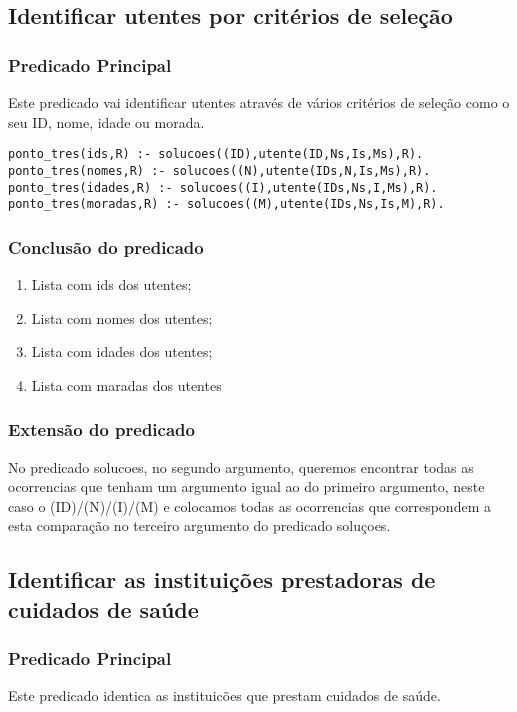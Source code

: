 \documentclass[a4paper]{report} %
\begin{document}
\subsection{Identificar utentes por critérios de seleção}

\subsubsection{Predicado Principal}
Este predicado vai identificar utentes através de vários critérios de seleção como o seu ID, nome, idade ou morada.

\begin{verbatim}
ponto_tres(ids,R) :- solucoes((ID),utente(ID,Ns,Is,Ms),R).
ponto_tres(nomes,R) :- solucoes((N),utente(IDs,N,Is,Ms),R).
ponto_tres(idades,R) :- solucoes((I),utente(IDs,Ns,I,Ms),R).
ponto_tres(moradas,R) :- solucoes((M),utente(IDs,Ns,Is,M),R).
\end{verbatim}

\subsubsection{Conclusão do predicado} 
\begin{enumerate}
\item Lista com ids dos utentes;
\item Lista com nomes dos utentes;
\item Lista com idades dos utentes;
\item Lista com maradas dos utentes
\end{enumerate}

\subsubsection{Extensão do predicado}
No predicado solucoes, no segundo argumento, queremos encontrar todas as ocorrencias que tenham um argumento igual ao do primeiro argumento, neste caso o (ID)/(N)/(I)/(M) e colocamos todas as ocorrencias que correspondem a esta comparação no terceiro argumento do predicado soluçoes.

\subsection{Identificar as instituições prestadoras de cuidados de saúde}

\subsubsection{Predicado Principal}
Este predicado identica as instituicões que prestam cuidados de saúde.
\end{document}
